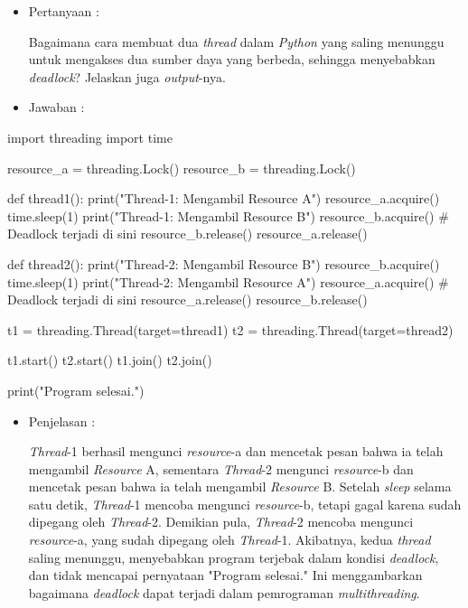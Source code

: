 \documentclass[12pt]{article}
\begin{document}
\begin{itemize}
    \item Pertanyaan :
    
    Bagaimana cara membuat dua \textit{thread} dalam \textit{Python} yang saling menunggu untuk mengakses dua sumber daya yang berbeda, sehingga menyebabkan \textit{deadlock}? Jelaskan juga \textit{output}-nya.
\end{itemize}
\begin{itemize}
    \item Jawaban :
\end{itemize}
\begin{python}
import threading
import time

resource_a = threading.Lock()
resource_b = threading.Lock()

def thread1():
    print("Thread-1: Mengambil Resource A")
    resource_a.acquire()
    time.sleep(1)
    print("Thread-1: Mengambil Resource B")
    resource_b.acquire()  # Deadlock terjadi di sini
    resource_b.release()
    resource_a.release()

def thread2():
    print("Thread-2: Mengambil Resource B")
    resource_b.acquire()
    time.sleep(1) 
    print("Thread-2: Mengambil Resource A")
    resource_a.acquire()  # Deadlock terjadi di sini
    resource_a.release()
    resource_b.release()

t1 = threading.Thread(target=thread1)
t2 = threading.Thread(target=thread2)

t1.start()
t2.start()
t1.join()
t2.join()

print("Program selesai.")
\end{python}
\begin{itemize}
    \item Penjelasan :

    \textit{Thread}-1 berhasil mengunci \textit{resource}-a dan mencetak pesan bahwa ia telah mengambil \textit{Resource} A, sementara \textit{Thread}-2 mengunci \textit{resource}-b dan mencetak pesan bahwa ia telah mengambil \textit{Resource} B. Setelah \textit{sleep} selama satu detik, \textit{Thread}-1 mencoba mengunci \textit{resource}-b, tetapi gagal karena sudah dipegang oleh \textit{Thread}-2. Demikian pula, \textit{Thread}-2 mencoba mengunci \textit{resource}-a, yang sudah dipegang oleh \textit{Thread}-1. Akibatnya, kedua \textit{thread} saling menunggu, menyebabkan program terjebak dalam kondisi \textit{deadlock}, dan tidak mencapai pernyataan "Program selesai." Ini menggambarkan bagaimana \textit{deadlock} dapat terjadi dalam pemrograman \textit{multithreading}.
\end{itemize}
\end{document}
